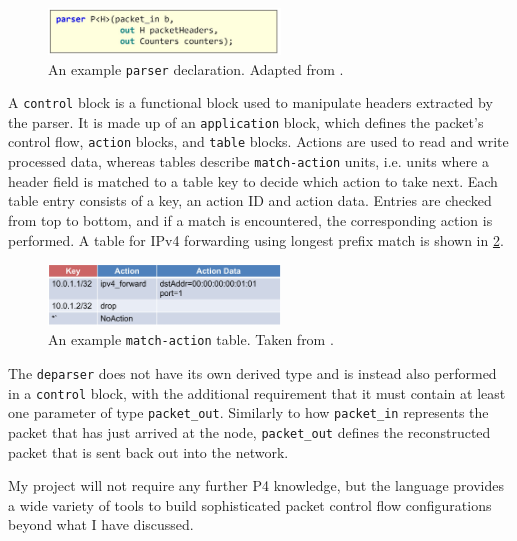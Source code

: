 \begin{figure}[htbp]
  \centering
    \includegraphics[width=0.55\textwidth]{figures/preparation/parser.jpg}
     \caption{An example \texttt{parser} declaration. Adapted from \cite{P4LangSpecs}.}
     \label{fig:prep-parser}
\end{figure}

A \texttt{control} block is a functional block used to manipulate headers extracted by the parser. It is made up of an \texttt{application} block, which defines the packet's control flow, \texttt{action} blocks, and \texttt{table} blocks. Actions are used to read and write processed data, whereas tables describe \texttt{match-action} units, i.e. units where a header field is matched to a table key to decide which action to take next. Each table entry consists of a key, an action ID and action data. Entries are checked from top to bottom, and if a match is encountered, the corresponding action is performed. A table for IPv4 forwarding using longest prefix match is shown in \cref{fig:prep-table}.

\begin{figure}[htbp]
  \centering
    \includegraphics[width=0.55\textwidth]{figures/preparation/ipv4_table.jpg}
     \caption{An example \texttt{match-action} table. Taken from \cite{P4LangTutorial}.}
     \label{fig:prep-table}
\end{figure}

The \texttt{deparser} does not have its own derived type and is instead also performed in a \texttt{control} block, with the additional requirement that it must contain at least one parameter of type \texttt{packet\_out}. Similarly to how \texttt{packet\_in} represents the packet that has just arrived at the node, \texttt{packet\_out} defines the reconstructed packet that is sent back out into the network.

My project will not require any further P4 knowledge, but the language provides a wide variety of tools to build sophisticated packet control flow configurations beyond what I have discussed.



